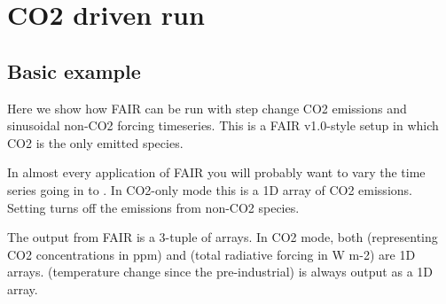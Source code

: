 \documentclass[letterpaper,10pt,english]{sphinxmanual}
\begin{document}
\section{CO2 driven run}
\label{\detokenize{examples:co2-driven-run}}

\subsection{Basic example}
\label{\detokenize{examples:basic-example}}
Here we show how FAIR can be run with step change CO2 emissions and
sinusoidal non-CO2 forcing timeseries. This is a FAIR v1.0-style setup
in which CO2 is the only emitted species.

In almost every application of FAIR you will probably want to vary the
 time series going in to . In CO2-only mode
this is a 1D array of CO2 emissions. Setting  turns
off the emissions from non-CO2 species.

The output from FAIR is a 3-tuple of  arrays. In CO2 mode,
both  (representing CO2 concentrations in ppm) and  (total
radiative forcing in W m-2) are 1D arrays.  (temperature change
since the pre-industrial) is always output as a 1D array.
\end{document}
